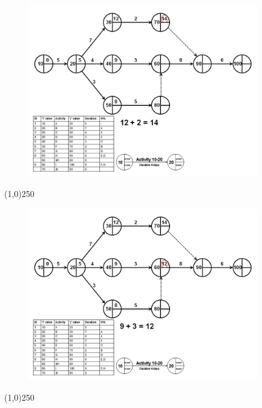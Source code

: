 \begin{frame}
\begin{figure}
	\centering
		\includegraphics[width = 10.0cm]{oldnotes/Slide106.jpg}
\end{figure}
\end{frame}
\begin{center}\line(1,0){250}\end{center}


\begin{frame}
\begin{figure}
	\centering
		\includegraphics[width = 10.0cm]{oldnotes/Slide107.jpg}
\end{figure}
\end{frame}
\begin{center}\line(1,0){250}\end{center}


